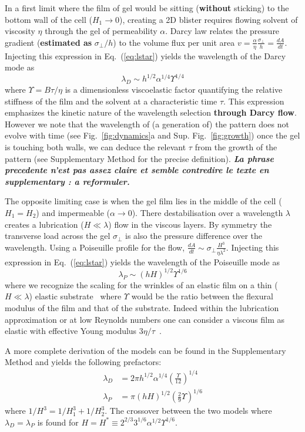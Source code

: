 \documentclass[twocolumn,superscriptaddress,showpacs,preprintnumbers,
amsmath,amssymb,prl]{revtex4-1}
\newcommand{\seb}[1]{\textbf{\color{blue}#1}} %
\begin{document}
In a first limit where the film of gel would be sitting (\seb{without} sticking) to the bottom wall of the cell ($H_1\rightarrow0$), creating a 2D blister requires flowing solvent of viscosity $\eta$ through the gel of permeability $\alpha$. Darcy law relates the pressure gradient (\seb{estimated as} $\sigma_\perp/h$) to the volume flux per unit area $v = \frac{\alpha}{\eta}\frac{\sigma_\perp}{h} = \frac{dA}{dt}$. Injecting this expression in Eq.~(\ref{eq:lstar}) yields the wavelength of the Darcy mode as
\begin{equation}
\lambda_D \sim h^{1/2} \alpha^{1/4} \Upsilon^{1/4}
\end{equation}
where $\Upsilon = B\tau/\eta$ is a dimensionless viscoelastic factor quantifying the relative stiffness of the film and the solvent at a characteristic time $\tau$. This expression emphasizes the kinetic nature of the wavelength selection \seb{through Darcy flow}. However we note that the wavelength of (a generation of) the pattern does not evolve with time (see Fig.~\ref{fig:dynamics}a and Sup. Fig.~\ref{fig:growth}) once the gel is touching both walls, we can deduce the relevant $\tau$ from the growth of the  pattern (see Supplementary Method for the precise definition). \seb{\it La phrase precedente n'est pas assez claire et semble contredire le texte en supplementary : a reformuler.}

The opposite limiting case is when the gel film lies in the middle of the cell ($H_1=H_2$) and impermeable ($\alpha\rightarrow 0$). There destabilisation over a wavelength $\lambda$ creates a lubrication ($H\ll\lambda$) flow in the viscous layers. By symmetry the transverse load across the gel $\sigma_\perp$ is also the pressure difference over the wavelength. Using a Poiseuille profile for the flow, $\frac{dA}{dt} \sim \sigma_\perp \frac{H^3}{\eta\lambda^2}$. Injecting this expression in Eq.~(\ref{eq:lstar}) yields the wavelength of the Poiseuille mode as
\begin{equation}
\lambda_P \sim (hH)^{1/2} \Upsilon^{1/6}
\end{equation}
where we recognize the scaling for the wrinkles of an elastic film on a thin ($H\ll\lambda$) elastic substrate~\cite{Cerda2003} where $\Upsilon$ would be the ratio between the flexural modulus of the film and that of the substrate. Indeed within the lubrication approximation or at low Reynolds numbers one can consider a viscous film as elastic with effective Young modulus $3\eta/\tau$~\cite{Biot1957,Boudaoud2001}.

A more complete derivation of the models can be found in the Supplementary Method and yields the following prefactors:
\begin{align}
\lambda_D &= 2\pi h^{1/2}\alpha^{1/4}\left(\frac{\Upsilon}{12}\right)^{1/4}\\
\lambda_P &= \pi (hH)^{1/2}\left(\frac{2}{9}\Upsilon\right)^{1/6}
\end{align}
where $1/H^3 = 1/H_1^3 + 1/H_2^3$. The crossover between the two models where $\lambda_D=\lambda_P$ is found for $H = H^* \equiv 2^{2/3} 3^{1/6} \alpha^{1/2} \Upsilon^{1/6}$.
\end{document}
